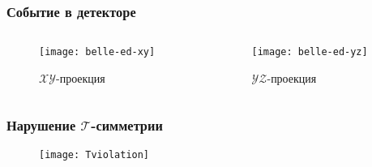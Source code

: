\begin{frame}
    \frametitle{Событие в детекторе}
    \begin{columns}
        \begin{column}{0.5\textwidth}
            \begin{figure}
            \texttt{[image: belle-ed-xy]}
            \caption{$\mathcal{XY}$-проекция}
            \end{figure}
        \end{column}
        \begin{column}{0.5\textwidth}
            \begin{figure}
            \texttt{[image: belle-ed-yz]}
            \caption{$\mathcal{YZ}$-проекция}
            \end{figure}
        \end{column}
    \end{columns}
\end{frame}
\begin{frame}
    \frametitle{Нарушение $\mathcal{T}$-симметрии}
    \begin{figure}
    \texttt{[image: Tviolation]}
    \end{figure}
\end{frame}
